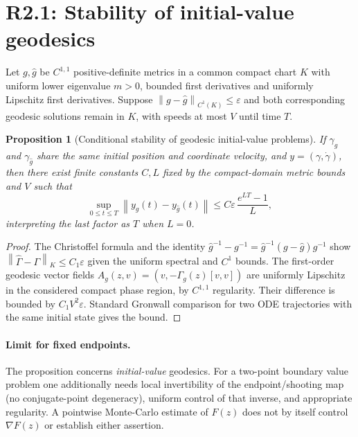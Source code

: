 \documentclass[10pt,a4paper]{article}
\newtheorem{proposition}{Proposition}
\newcommand{\norm}[1]{\left\lVert#1\right\rVert}
\begin{document}
\section{R2.1: Stability of initial-value geodesics}
Let $g,\widehat g$ be $C^{1,1}$ positive-definite metrics in a common compact chart $K$ with uniform lower eigenvalue $m>0$, bounded first derivatives and uniformly Lipschitz first derivatives. Suppose $\norm{g-\widehat g}_{C^1(K)}\le\varepsilon$ and both corresponding geodesic solutions remain in $K$, with speeds at most $V$ until time $T$.
\begin{proposition}[Conditional stability of geodesic initial-value problems]\label{prop:ivp}
If $\gamma_g$ and $\gamma_{\widehat g}$ share the same initial position and coordinate velocity, and $y=(\gamma,\dot\gamma)$, then there exist finite constants $C,L$ fixed by the compact-domain metric bounds and $V$ such that
\begin{equation}
 \sup_{0\le t\le T}\norm{y_g(t)-y_{\widehat g}(t)}\le C\varepsilon\,\frac{e^{LT}-1}{L},
\end{equation}
interpreting the last factor as $T$ when $L=0$.
\end{proposition}
\begin{proof}
The Christoffel formula and the identity $\widehat g^{-1}-g^{-1}=\widehat g^{-1}(g-\widehat g)g^{-1}$ show $\norm{\widehat\Gamma-\Gamma}_{K}\le C_1\varepsilon$ given the uniform spectral and $C^1$ bounds. The first-order geodesic vector fields $A_g(z,v)=(v,-\Gamma_g(z)[v,v])$ are uniformly Lipschitz in the considered compact phase region, by $C^{1,1}$ regularity. Their difference is bounded by $C_1 V^2\varepsilon$. Standard Gronwall comparison for two ODE trajectories with the same initial state gives the bound.
\end{proof}
\paragraph{Limit for fixed endpoints.} The proposition concerns \emph{initial-value} geodesics. For a two-point boundary value problem one additionally needs local invertibility of the endpoint/shooting map (no conjugate-point degeneracy), uniform control of that inverse, and appropriate regularity. A pointwise Monte-Carlo estimate of $F(z)$ does not by itself control $\nabla F(z)$ or establish either assertion.
\end{document}
